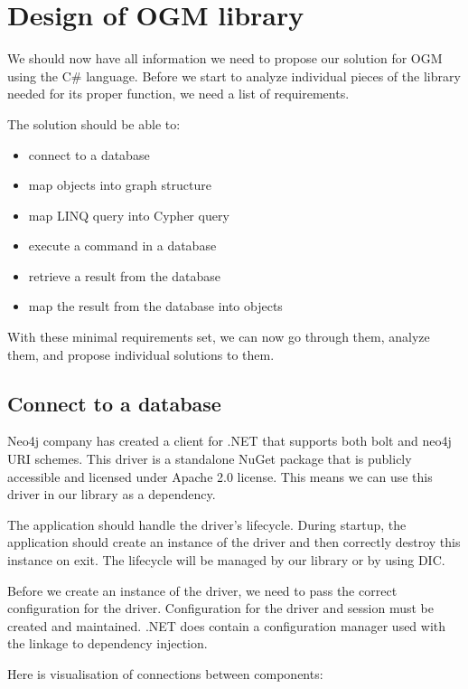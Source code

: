 \chapter {Design of OGM library}

We should now have all information we need to propose our solution for OGM using the C\# language.
Before we start to analyze individual pieces of the library needed for its proper function, we need a list of requirements.

The solution should be able to:
\begin{itemize}
    \item {connect to a database}
    \item {map objects into graph structure}
    \item {map LINQ query into Cypher query}
    \item {execute a command in a database}
    \item {retrieve a result from the database}
    \item {map the result from the database into objects}
\end{itemize}

With these minimal requirements set, we can now go through them, analyze them, and propose individual solutions to them.

\section{Connect to a database}

Neo4j company has created a client for .NET that supports both bolt and neo4j URI schemes. \cite{noauthor_client_nodate} This driver is a standalone NuGet package that is publicly accessible and licensed under Apache 2.0 license. This means we can use this driver in our library as a dependency.

The application should handle the driver's lifecycle. During startup, the application should create an instance of the driver and then correctly destroy this instance on exit. The lifecycle will be managed by our library or by using DIC.

Before we create an instance of the driver, we need to pass the correct configuration for the driver. Configuration for the driver and session must be created and maintained. .NET does contain a configuration manager used with the linkage to dependency injection.

Here is visualisation of connections between components:

